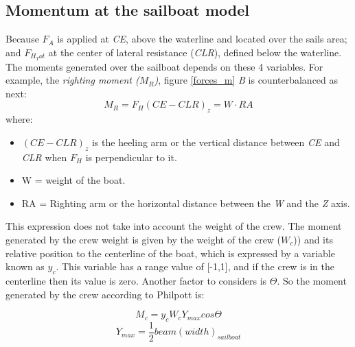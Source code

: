 \subsection{Momentum at the sailboat model} \label{sec:momentum_types}
Because $F_{A}$ is applied at \textit{CE}, above the waterline and located over the sails area; and $F_{H_Tot}$ at the center of lateral resistance (\textit{CLR}), defined below the waterline. The moments generated over the sailboat depends on these 4 variables. For example, the \textit{righting moment ($M_{R}$)}, figure \ref{forces_m} \textit{B} is counterbalanced as next: 
\begin{equation}\label{eq:right_mom}
    M_{R}=F_{H}(CE-CLR)_{z}=W \cdot RA
\end{equation}
where:\par
\begin{itemize}
    \item $(CE-CLR)_{z}$ is the heeling arm or the vertical distance between \textit{CE} and \textit{CLR} when $F_{H}$ is perpendicular to it.
    \item W = weight of the boat.
    \item RA = Righting arm or the horizontal distance between the \textit{W} and the \textit{Z} axis.
\end{itemize}
This expression does not take into account the weight of the crew. The moment generated by the crew weight is given by the weight of the crew (\textit{$W_{c}$})) and its relative position to the centerline of the boat, which is expressed by a variable known as \textit{$y_{c}$}. This variable has a range value of [-1,1], and if the crew is in the centerline then its value is zero. Another factor to considers is $\Theta$. So the moment generated by the crew according to Philpott \cite{philpott1993yacht} is: \par 
 
\begin{equation}\label{eq:Moment_crew}
    M_{c} = y_{c} W_{c} Y_{max} cos \Theta
\end{equation} 
\begin{equation} \label{eq:Mcrew_dist}
    Y_{max} = \frac{1}{2} beam(width)_{sailboat}
\end{equation}


